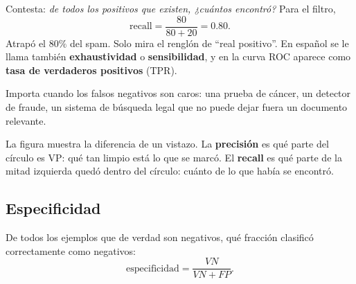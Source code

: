 \documentclass[11pt,letterpaper]{article}
\begin{document}
Contesta: \textit{de todos los positivos que existen, ¿cuántos
encontró?} Para el filtro,
\[
    \text{recall} = \frac{80}{80 + 20} = 0.80 .
\]
Atrapó el $80\%$ del spam. Solo mira el renglón de ``real positivo''.
En español se le llama también \textbf{exhaustividad} o
\textbf{sensibilidad}, y en la curva ROC aparece como \textbf{tasa de
verdaderos positivos} (TPR).

Importa cuando los falsos negativos son caros: una prueba de cáncer,
un detector de fraude, un sistema de búsqueda legal que no puede
dejar fuera un documento relevante.

\begin{center}
\end{center}

La figura muestra la diferencia de un vistazo. La \textbf{precisión}
es qué parte del círculo es VP: qué tan limpio está lo que se marcó. El
\textbf{recall} es qué parte de la mitad izquierda quedó dentro del
círculo: cuánto de lo que había se encontró.


\subsection*{Especificidad}

\begin{definicion}[Especificidad]
    De todos los ejemplos que de verdad son negativos, qué fracción
    clasificó correctamente como negativos:
    \[
        \text{especificidad} = \frac{VN}{VN + FP} .
    \]
\end{definicion}
\end{document}
